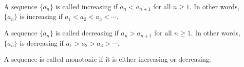 \begin{frame}
\begin{definition}
A sequence $\{ a_n\}$ is called increasing if $a_n < a_{n+1}$ for all $n \geq 1$.  In other words, $\{ a_n\}$ is increasing if $a_1 < a_2 < a_3 < \cdots$.

A sequence $\{ a_n\}$ is called decreasing if $a_n > a_{n+1}$ for all $n \geq 1$.  In other words, $\{ a_n\}$ is decreasing if $a_1 > a_2 > a_3 > \cdots$.

A sequence is called monotonic if it is either increasing or decreasing.
\end{definition}
\end{frame}
